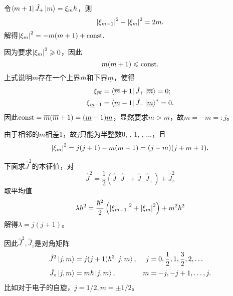 令$\left\langle m+1\right\vert\hat J_+\left\vert m\right\rangle=\xi_m\hbar$，则 
\[
	\left\lvert\xi_{m-1}\right\rvert^2-\left\lvert\xi_m\right\rvert^2=2m.
\]
解得$\left\lvert\xi_m\right\rvert^2=-m(m+1)+\mathrm{const}.$

因为要求$\left\lvert\xi_m\right\rvert^2\geqslant 0$，因此 
\[
m(m+1)\leqslant\mathrm{const}.
\]
上式说明$m$存在一个上界$\overline m$和下界$\underline m$，使得
\begin{align*}
	\xi_{\overline m}&=\left\langle \overline m+1\right\vert\hat J_+\left\vert \overline m\right\rangle=0;\\
	\xi_{\underline m-1}&=\left\langle \underline m-1\right\vert\hat J_-\left\vert \underline m\right\rangle^\ast=0.
\end{align*}
因此$\mathrm{const}=\overline m(\overline m+1)=(\underline m-1)\underline m$，显然要求$\overline m>\underline m$，故$\overline m=-\underline m=:j$。

由于相邻的$m$相差1，故$j$只能为半整数0, , 1, , $\ldots$，且
\[
	\left\lvert\xi_m\right\rvert^2=j(j+1)-m(m+1)=(j-m)(j+m+1).
\]

下面求$\hat J^2$的本征值，对
\[
	\hat J^2=\frac12(\hat J_+\hat J_-+\hat J_-\hat J_+)+\hat J_z^2
\]
取平均值
\[
	\lambda\hbar^2=\frac{\hbar^2}2\left(\left\lvert\xi_{m-1}\right\rvert^2+\left\lvert\xi_m\right\rvert^2\right)+m^2\hbar^2
\]
解得$\lambda=j(j+1)$。

因此$\hat J^2,\hat J_z$是对角矩阵
\begin{align}
	\hat J^2\left\vert j,m\right\rangle&=j(j+1)\hbar^2\left\vert j,m\right\rangle,&j&=0,\frac12,1,\frac32,2,\ldots\\
	\hat J_z\left\vert j,m\right\rangle&=m\hbar\left\vert j,m\right\rangle,&m&=-j,-j+1,\ldots,j.
\end{align}
比如对于电子的自旋，$j=1/2,m=\pm 1/2$。

